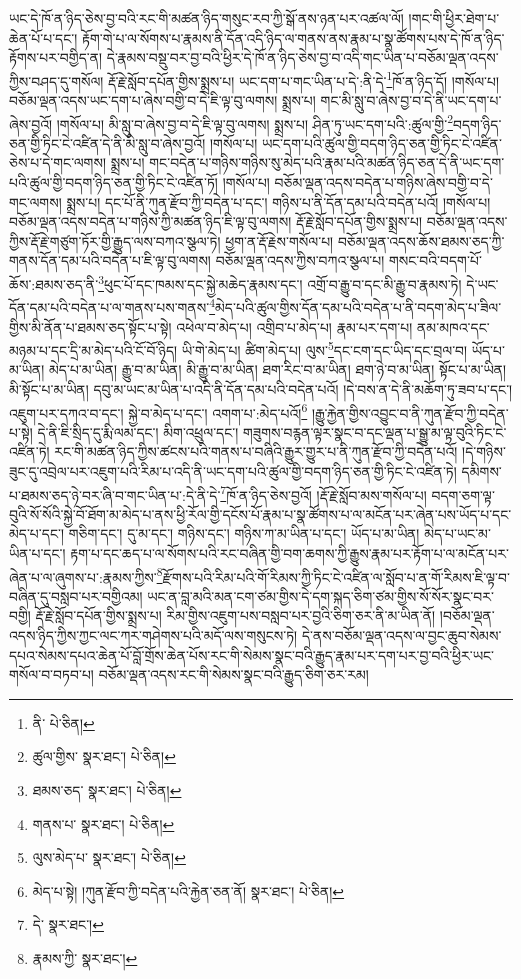 ཡང་དེ་ཁོ་ན་ཉིད་ཅེས་བྱ་བའི་རང་གི་མཚན་ཉིད་གསུང་རབ་ཀྱི་སྒོ་ནས་ཉན་པར་འཚལ་ལོ། །གང་གི་ཕྱིར་ཐེག་པ་ཆེན་པོ་པ་དང་། རྟོག་གེ་པ་ལ་སོགས་པ་རྣམས་ནི་དོན་འདི་ཉིད་ལ་གནས་ནས་རྣམ་པ་སྣ་ཚོགས་པས་དེ་ཁོ་ན་ཉིད་རྟོགས་པར་བགྱིད་ན། དེ་རྣམས་བསྡུ་བར་བྱ་བའི་ཕྱིར་དེ་ཁོ་ན་ཉིད་ཅེས་བྱ་བ་འདི་གང་ཡིན་པ་བཅོམ་ལྡན་འདས་ཀྱིས་བཤད་དུ་གསོལ། རྡོ་རྗེ་སློབ་དཔོན་གྱིས་སྨྲས་པ། ཡང་དག་པ་གང་ཡིན་པ་དེ་:ནི་དེ་\footnote{ནི་  པེ་ཅིན། }ཁོ་ན་ཉིད་དོ། །གསོལ་པ། བཅོམ་ལྡན་འདས་ཡང་དག་པ་ཞེས་བགྱི་བ་དེ་ཇི་ལྟ་བུ་ལགས། སྨྲས་པ། གང་མི་སླུ་བ་ཞེས་བྱ་བ་དེ་ནི་ཡང་དག་པ་ཞེས་བྱའོ། །གསོལ་པ། མི་སླུ་བ་ཞེས་བྱ་བ་དེ་ཇི་ལྟ་བུ་ལགས། སྨྲས་པ། ཤིན་ཏུ་ཡང་དག་པའི་:ཚུལ་གྱི་\footnote{ཚུལ་གྱིས་  སྣར་ཐང་།  པེ་ཅིན། }བདག་ཉིད་ཅན་གྱི་ཏིང་ངེ་འཛིན་དེ་ནི་མི་སླུ་བ་ཞེས་བྱའོ། །གསོལ་པ། ཡང་དག་པའི་ཚུལ་གྱི་བདག་ཉིད་ཅན་གྱི་ཏིང་ངེ་འཛིན་ཅེས་པ་དེ་གང་ལགས། སྨྲས་པ། གང་བདེན་པ་གཉིས་གཉིས་སུ་མེད་པའི་རྣམ་པའི་མཚན་ཉིད་ཅན་དེ་ནི་ཡང་དག་པའི་ཚུལ་གྱི་བདག་ཉིད་ཅན་གྱི་ཏིང་ངེ་འཛིན་ཏོ། །གསོལ་པ། བཅོམ་ལྡན་འདས་བདེན་པ་གཉིས་ཞེས་བགྱི་བ་དེ་གང་ལགས། སྨྲས་པ། དང་པོ་ནི་ཀུན་རྫོབ་ཀྱི་བདེན་པ་དང་། གཉིས་པ་ནི་དོན་དམ་པའི་བདེན་པའོ། །གསོལ་པ། བཅོམ་ལྡན་འདས་བདེན་པ་གཉིས་ཀྱི་མཚན་ཉིད་ཇི་ལྟ་བུ་ལགས། རྡོ་རྗེ་སློབ་དཔོན་གྱིས་སྨྲས་པ། བཅོམ་ལྡན་འདས་ཀྱིས་རྡོ་རྗེ་གཙུག་ཏོར་གྱི་རྒྱུད་ལས་བཀའ་སྩལ་ཏེ། ཕྱག་ན་རྡོ་རྗེས་གསོལ་པ། བཅོམ་ལྡན་འདས་ཆོས་ཐམས་ཅད་ཀྱི་གནས་དོན་དམ་པའི་བདེན་པ་ཇི་ལྟ་བུ་ལགས། བཅོམ་ལྡན་འདས་ཀྱིས་བཀའ་སྩལ་པ། གསང་བའི་བདག་པོ་ཆོས་:ཐམས་ཅད་ནི་\footnote{ཐམས་ཅད་  སྣར་ཐང་།  པེ་ཅིན། }ཕུང་པོ་དང་ཁམས་དང་སྐྱེ་མཆེད་རྣམས་དང་། འགྲོ་བ་རྒྱུ་བ་དང་མི་རྒྱུ་བ་རྣམས་ཏེ། དེ་ཡང་དོན་དམ་པའི་བདེན་པ་ལ་གནས་པས་གནས་\footnote{གནས་པ་  སྣར་ཐང་།  པེ་ཅིན། }མེད་པའི་ཚུལ་གྱིས་དོན་དམ་པའི་བདེན་པ་ནི་བདག་མེད་པ་ཟིལ་གྱིས་མི་ནོན་པ་ཐམས་ཅད་སྟོང་པ་སྟེ། འཕེལ་བ་མེད་པ། འགྲིབ་པ་མེད་པ། རྣམ་པར་དག་པ། ནམ་མཁའ་དང་མཉམ་པ་དང་དྲི་མ་མེད་པའི་ངོ་བོ་ཉིད། ཡི་གེ་མེད་པ། ཚིག་མེད་པ། ལུས་\footnote{ལུས་མེད་པ་  སྣར་ཐང་།  པེ་ཅིན། }དང་ངག་དང་ཡིད་དང་བྲལ་བ། ཡོད་པ་མ་ཡིན། མེད་པ་མ་ཡིན། རྒྱུ་བ་མ་ཡིན། མི་རྒྱུ་བ་མ་ཡིན། ཐག་རིང་བ་མ་ཡིན། ཐག་ཉེ་བ་མ་ཡིན། སྟོང་པ་མ་ཡིན། མི་སྟོང་པ་མ་ཡིན། དབུ་མ་ཡང་མ་ཡིན་པ་འདི་ནི་དོན་དམ་པའི་བདེན་པའོ། །དེ་བས་ན་དེ་ནི་མཆོག་ཏུ་ཟབ་པ་དང་། འཇུག་པར་དཀའ་བ་དང་། སྐྱེ་བ་མེད་པ་དང་། འགག་པ་:མེད་པའོ།\footnote{མེད་པ་སྟེ། །ཀུན་རྫོབ་ཀྱི་བདེན་པའི་རྐྱེན་ཅན་ནོ།  སྣར་ཐང་།  པེ་ཅིན། } །རྒྱུ་རྐྱེན་གྱིས་འབྱུང་བ་ནི་ཀུན་རྫོབ་ཀྱི་བདེན་པ་སྟེ། དེ་ནི་ཇི་སྲིད་དུ་རྨི་ལམ་དང་། མིག་འཕྲུལ་དང་། གཟུགས་བརྙན་ལྟར་སྣང་བ་དང་ལྡན་པ་སྒྱུ་མ་ལྟ་བུའི་ཏིང་ངེ་འཛིན་ཏེ། རང་གི་མཚན་ཉིད་ཀྱིས་ཚངས་པའི་གནས་པ་བཞིའི་རྒྱུར་གྱུར་པ་ནི་ཀུན་རྫོབ་ཀྱི་བདེན་པའོ། །དེ་གཉིས་ཟུང་དུ་འབྲེལ་པར་འཇུག་པའི་རིམ་པ་འདི་ནི་ཡང་དག་པའི་ཚུལ་གྱི་བདག་ཉིད་ཅན་གྱི་ཏིང་ངེ་འཛིན་ཏེ། དམིགས་པ་ཐམས་ཅད་ཉེ་བར་ཞི་བ་གང་ཡིན་པ་:དེ་ནི་དེ་\footnote{དེ་  སྣར་ཐང་། }ཁོ་ན་ཉིད་ཅེས་བྱའོ། །རྡོ་རྗེ་སློབ་མས་གསོལ་པ། བདག་ཅག་ལྟ་བུའི་སོ་སོའི་སྐྱེ་བོ་ཐོག་མ་མེད་པ་ནས་ཕྱི་རོལ་གྱི་དངོས་པོ་རྣམ་པ་སྣ་ཚོགས་པ་ལ་མངོན་པར་ཞེན་པས་ཡོད་པ་དང་མེད་པ་དང་། གཅིག་དང་། དུ་མ་དང་། གཉིས་དང་། གཉིས་ཀ་མ་ཡིན་པ་དང་། ཡོད་པ་མ་ཡིན། མེད་པ་ཡང་མ་ཡིན་པ་དང་། རྟག་པ་དང་ཆད་པ་ལ་སོགས་པའི་རང་བཞིན་གྱི་བག་ཆགས་ཀྱི་རྒྱུས་རྣམ་པར་རྟོག་པ་ལ་མངོན་པར་ཞེན་པ་ལ་ཞུགས་པ་:རྣམས་ཀྱིས་\footnote{རྣམས་ཀྱི་  སྣར་ཐང་། }རྫོགས་པའི་རིམ་པའི་གོ་རིམས་ཀྱི་ཏིང་ངེ་འཛིན་ལ་སློབ་པ་ན་གོ་རིམས་ཇི་ལྟ་བ་བཞིན་དུ་བསླབ་པར་བགྱིའམ། ཡང་ན་བླ་མའི་མན་ངག་ཙམ་གྱིས་དེ་དག་སྐད་ཅིག་ཙམ་གྱིས་སོ་སོར་སྣང་བར་བགྱི། རྡོ་རྗེ་སློབ་དཔོན་གྱིས་སྨྲས་པ། རིམ་གྱིས་འཇུག་པས་བསླབ་པར་བྱའི་ཅིག་ཅར་ནི་མ་ཡིན་ནོ། །བཅོམ་ལྡན་འདས་ཉིད་ཀྱིས་ཀྱང་ལང་ཀར་གཤེགས་པའི་མདོ་ལས་གསུངས་ཏེ། དེ་ནས་བཅོམ་ལྡན་འདས་ལ་བྱང་ཆུབ་སེམས་དཔའ་སེམས་དཔའ་ཆེན་པོ་བློ་གྲོས་ཆེན་པོས་རང་གི་སེམས་སྣང་བའི་རྒྱུད་རྣམ་པར་དག་པར་བྱ་བའི་ཕྱིར་ཡང་གསོལ་བ་བཏབ་པ། བཅོམ་ལྡན་འདས་རང་གི་སེམས་སྣང་བའི་རྒྱུད་ཅིག་ཅར་རམ། 